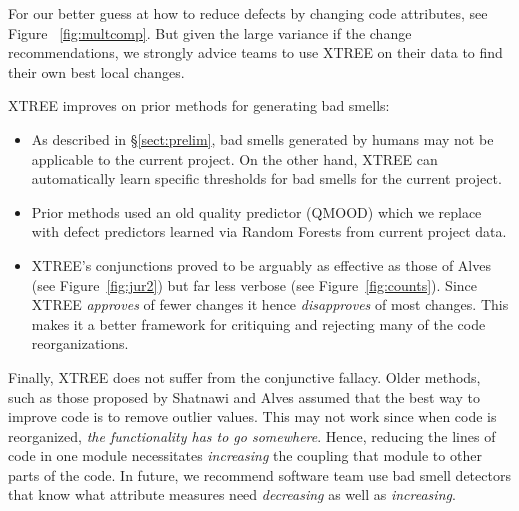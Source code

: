 \documentclass[twocolumn,5p]{elsarticle}
\newcommand{\tion}[1]{\S\ref{sect:#1}}
\newcommand{\fig}[1]{Figure~\ref{fig:#1}}
\theoremstyle{break}
\begin{document}
	For our better guess at how to reduce defects by changing code attributes,
	see  Figure ~\ref{fig:multcomp}. But given the large variance if the 
	change 
	recommendations, we strongly advice teams to use
	XTREE on their data to find their own best local changes.
	
	XTREE improves on prior methods for generating bad smells:
	\begin{itemize}
		\item As described in \tion{prelim}, bad smells generated by humans may 
		not be applicable to the current project. On the other hand, XTREE can 
		automatically learn specific thresholds
		for bad smells for the current project.
		\item Prior methods used an old quality predictor (QMOOD) which we 
		replace with defect predictors learned via Random Forests
		from   current project data.
		
		
		\item XTREE's conjunctions proved to be arguably as effective
		as those of Alves (see \fig{jur2}) but far less verbose (see 
		\fig{counts}). Since XTREE {\em approves} of fewer changes
		it hence {\em disapproves} of most changes. This makes it a better 
		framework 
		for critiquing and rejecting
		many of the code reorganizations.
	\end{itemize}
	Finally, XTREE does not suffer from the conjunctive fallacy.
	Older methods, such as those proposed by  Shatnawi and Alves assumed
	that the best way to improve code is to remove outlier  values. This may 
	not work since when code is reorganized,
	{\em the functionality has to go somewhere}. Hence,  reducing the lines of 
	code in one module necessitates
	{\em increasing} the coupling that module
	to other parts of the code. In future, we recommend software team use bad 
	smell detectors that know what attribute measures
	need {\em decreasing} as well as {\em increasing}.
	
	
	
\end{document}
